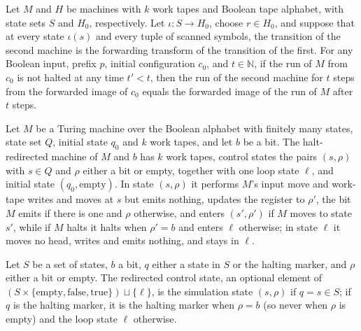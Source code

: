 \begin{theorem}
\label{Turing.emit_run}
\leanok
{}
Let $M$ and $H$ be machines with $k$ work tapes and Boolean tape alphabet, with state
sets $S$ and $H_0$, respectively. Let $\iota:S\to H_0$, choose $r\in H_0$, and suppose
that at every state $\iota(s)$ and every tuple of scanned symbols, the transition of the
second machine is the forwarding transform of the transition of the first. For any
Boolean input, prefix $p$, initial configuration $c_0$, and $t\in\mathbb N$, if the run
of $M$ from $c_0$ is not halted at any time $t'<t$, then the run of the second machine
for $t$ steps from the forwarded image of $c_0$ equals the forwarded image of the run of
$M$ after $t$ steps.
\end{theorem}

\begin{definition}
\label{Turing.FinTM.redirectTM}
\leanok
{}
Let $M$ be a Turing machine over the Boolean alphabet with finitely many states, state
set $Q$, initial state $q_0$ and $k$ work tapes, and let $b$ be a bit. The halt-redirected
machine of $M$ and $b$ has $k$ work tapes, control states the pairs $(s, \rho)$ with
$s \in Q$ and $\rho$ either a bit or empty, together with one loop state $\ell$, and
initial state $(q_0, \text{empty})$. In state $(s, \rho)$ it performs $M$'s input move
and work-tape writes and moves at $s$ but emits nothing, updates the register to $\rho'$,
the bit $M$ emits if there is one and $\rho$ otherwise, and enters $(s', \rho')$ if $M$
moves to state $s'$, while if $M$ halts it halts when $\rho' = b$ and enters $\ell$
otherwise; in state $\ell$ it moves no head, writes and emits nothing, and stays in
$\ell$.
\end{definition}

\begin{definition}
\label{Turing.FinTM.redirectState}
\leanok
Let $S$ be a set of states, $b$ a bit, $q$ either a state in $S$ or the halting marker,
and $\rho$ either a bit or empty. The redirected control state, an optional element of
$(S \times \{\text{empty}, \mathrm{false}, \mathrm{true}\}) \sqcup \{\ell\}$, is the
simulation state $(s, \rho)$ if $q = s \in S$; if $q$ is the halting marker, it is the
halting marker when $\rho = b$ (so never when $\rho$ is empty) and the loop state $\ell$
otherwise.
\end{definition}


